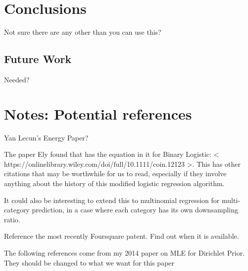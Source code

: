 \documentclass[twoside]{article}
\begin{document}
\section{Conclusions}

Not sure there are any other than you can use this?

\subsection{Future Work}

Needed?

\section{Notes: Potential references}

Yan Lecun’s Energy Paper?

The paper Ely found that has the equation in it for Binary Logistic: < https://onlinelibrary.wiley.com/doi/full/10.1111/coin.12123 >. This has other citations that may be worthwhile for us to read, especially if they involve anything about the history of this modified logistic regression algorithm.

It could also be interesting to extend this to multinomial regression for multi-category prediction, in a case where each category has its own downsampling ratio.

Reference the most recently Foursquare patent. Find out when it is available.

The following references come from my 2014 paper on MLE for Dirichlet Prior. They should be changed to what we want for this paper

\end{document}

